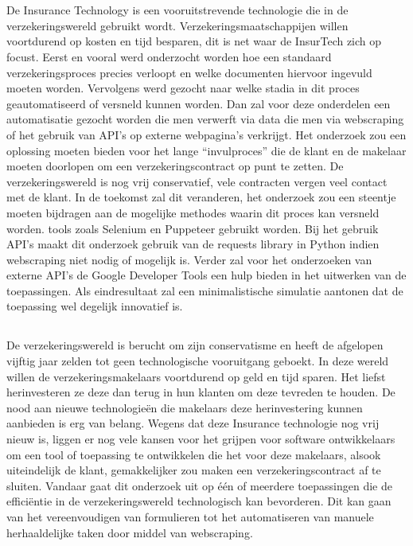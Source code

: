 
\chapter{}
\label{ch:inleiding}

De Insurance Technology is een vooruitstrevende technologie die in de verzekeringswereld gebruikt wordt. Verzekeringsmaatschappijen willen voortdurend op kosten en tijd besparen, dit is net waar de InsurTech zich op focust. Eerst en vooral werd onderzocht worden hoe een standaard verzekeringsproces precies verloopt en welke documenten hiervoor ingevuld moeten worden. Vervolgens werd gezocht naar welke stadia in dit proces geautomatiseerd of versneld kunnen worden. Dan zal voor deze onderdelen een automatisatie gezocht worden die men verwerft via data die men via webscraping of het gebruik van API’s op externe webpagina’s verkrijgt. Het onderzoek zou een oplossing moeten bieden voor het lange “invulproces” die de klant en de makelaar moeten doorlopen om een verzekeringscontract op punt te zetten. De verzekeringswereld is nog vrij conservatief, vele contracten vergen veel contact met de klant. In de toekomst zal dit veranderen, het onderzoek zou een steentje moeten bijdragen aan de mogelijke methodes waarin dit proces kan versneld worden. tools zoals Selenium en Puppeteer gebruikt worden. Bij het gebruik API’s maakt dit onderzoek gebruik van de requests library in Python indien webscraping niet nodig of mogelijk is. Verder zal voor het onderzoeken van externe API’s de Google Developer Tools een hulp bieden in het uitwerken van de toepassingen. Als eindresultaat zal een minimalistische simulatie aantonen dat de toepassing wel degelijk innovatief is.

\section{}
\label{sec:probleemstelling}

De verzekeringswereld is berucht om zijn conservatisme en heeft de afgelopen vijftig jaar zelden tot geen technologische vooruitgang geboekt.
In deze wereld willen de verzekeringsmakelaars voortdurend op geld en tijd sparen. Het liefst herinvesteren ze deze dan terug in hun klanten om deze tevreden te houden. De nood aan nieuwe technologieën die makelaars deze herinvestering kunnen aanbieden is erg van belang. Wegens dat deze Insurance technologie nog vrij nieuw is, liggen er nog vele kansen voor het grijpen voor software ontwikkelaars om een tool of toepassing te ontwikkelen die het voor deze makelaars, alsook uiteindelijk de klant, gemakkelijker zou maken een verzekeringscontract af te sluiten. Vandaar gaat dit onderzoek uit op één of meerdere toepassingen die de efficiëntie in de verzekeringswereld technologisch kan bevorderen. Dit kan gaan van het vereenvoudigen van formulieren tot het automatiseren van manuele herhaaldelijke taken door middel van webscraping.

